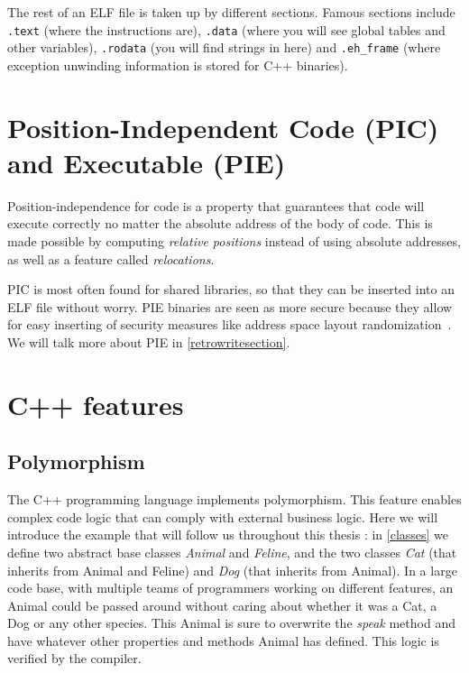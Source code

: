 \documentclass[a4paper,11pt,oneside]{report}
\begin{document}
The rest of an ELF file is taken up by different sections.
Famous sections include
\texttt{.text} (where the instructions are),
\texttt{.data} (where you will see global tables and other variables),
\texttt{.rodata} (you will find strings in here)
and \texttt{.eh\_frame} (where exception unwinding information is stored for 
C++ binaries).


\section{Position-Independent Code (PIC) and Executable (PIE)}
\label{picpie}

Position-independence for code is a property that guarantees that code will 
execute correctly no matter the absolute address of the body of code.
This is made possible by computing \emph{relative positions} instead of
using absolute addresses, as well as a feature called \emph{relocations}.

PIC is most often found for shared libraries, so that they can be inserted into 
an ELF file without worry.
PIE binaries are seen as more secure because they allow for easy inserting of 
security measures like address space layout 
randomization~\cite{aslr}.
We will talk more about PIE in \autoref{retrowritesection}.


\section{C++ features}

\subsection{Polymorphism}
\label{polymorphism}

The C++ programming language implements polymorphism.
This feature enables complex code logic that can comply with external business 
logic.
Here we will introduce the example that will follow us throughout this thesis :
in \autoref{classes} we define two abstract base classes \emph{Animal} and 
\emph{Feline},
and the two classes \emph{Cat} (that inherits from Animal and Feline) and 
\emph{Dog} (that inherits from Animal).
In a large code base, with multiple teams of programmers working on different 
features,
an Animal could be passed around without caring about whether it was a Cat, a 
Dog or any other species.
This Animal is sure to overwrite the \emph{speak} method and have whatever 
other properties and methods Animal has defined.
This logic is verified by the compiler.
\end{document}
